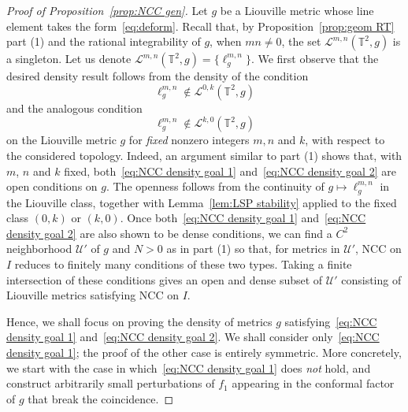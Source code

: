 \documentclass[11pt,letterpaper,oneside]{amsart}
\newcommand{\T}{\mathbb{T}}
\theoremstyle{definition}
\theoremstyle{remark}
\theoremstyle{definition}
\theoremstyle{remark}
\newcommand{\CL}{\mathcal{L}}
\newcommand{\CU}{\mathcal{U}}
\begin{document}
\begin{proof}[Proof of Proposition~\ref{prop:NCC gen}]
    Let $g$ be a Liouville metric whose line element takes the form~\eqref{eq:deform}.
    Recall that, by Proposition~\ref{prop:geom RT} part (1) and the rational integrability of $g$, when $mn \neq 0$, the set $\CL^{m,n}(\T^2, g)$ is a singleton. 
    Let us denote $\CL^{m,n}(\T^2, g) = \{\ell^{m,n}_g\}$.
    We first observe that the desired density result follows from the density of the condition
    \begin{equation}\label{eq:NCC density goal 1}
        \ell^{m,n}_g \notin \CL^{0,k}(\T^2, g)
    \end{equation}
    and the analogous condition 
    \begin{equation}\label{eq:NCC density goal 2}
        \ell^{m,n}_g \notin \CL^{k,0}(\T^2, g)
    \end{equation}
    on the Liouville metric $g$ for \emph{fixed} nonzero integers $m, n$ and $k$, with respect to the considered topology.
    Indeed, an argument similar to part (1) shows that, with $m$, $n$ and $k$ fixed, both~\eqref{eq:NCC density goal 1} and~\eqref{eq:NCC density goal 2} are open conditions on $g$.
    The openness follows from the continuity of $g\mapsto \ell^{m,n}_g$ in the Liouville class, together with Lemma~\ref{lem:LSP stability} applied to the fixed class $(0,k)$ or $(k,0)$.
    Once both~\eqref{eq:NCC density goal 1} and~\eqref{eq:NCC density goal 2} are also shown to be dense conditions, we can find a $C^2$ neighborhood $\CU'$ of $g$ and $N > 0$ as in part (1) so that, for metrics in $\CU'$, NCC on $I$ reduces to finitely many conditions of these two types.
    Taking a finite intersection of these conditions gives an open and dense subset of $\CU'$ consisting of Liouville metrics satisfying NCC on $I$.

\medskip

    Hence, we shall focus on proving the density of metrics $g$ satisfying~\eqref{eq:NCC density goal 1} and~\eqref{eq:NCC density goal 2}.
    We shall consider only~\eqref{eq:NCC density goal 1}; the proof of the other case is entirely symmetric.
    More concretely, we start with the case in which~\eqref{eq:NCC density goal 1} does \emph{not} hold, and construct arbitrarily small perturbations of $f_1$ appearing in the conformal factor of $g$ that break the coincidence.

\medskip


\end{proof}
\end{document}
